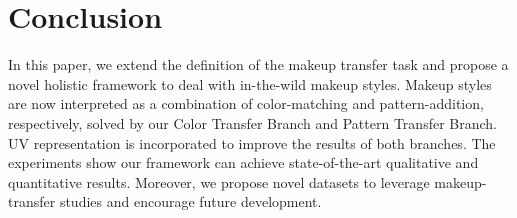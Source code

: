 \documentclass[final]{cvpr}
\begin{document}
\section{Conclusion}
\vspace{-2mm}
In this paper, we extend the definition of the makeup transfer task and propose a novel holistic framework to deal with in-the-wild makeup styles. Makeup styles are now interpreted as a combination of color-matching and pattern-addition, respectively, solved by our Color Transfer Branch and Pattern Transfer Branch. UV representation is incorporated to improve the results of both branches. The experiments show our framework can achieve state-of-the-art qualitative and quantitative results. Moreover, we propose novel datasets to leverage  makeup-transfer studies and encourage future development.

{\small
\setlength{\bibsep}{0pt}

\setlength{\bibsep}{0pt}

}
\end{document}
